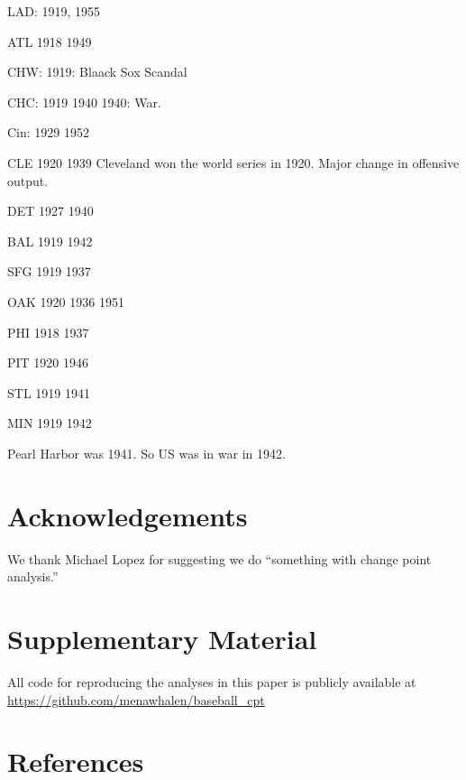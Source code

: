 \documentclass[
  12pt,
]{article}
\begin{document}
LAD: 1919, 1955

ATL 1918 1949

CHW: 1919: Blaack Sox Scandal

CHC: 1919 1940 1940: War.

Cin: 1929 1952

CLE 1920 1939 Cleveland won the world series in 1920. Major change in
offensive output.

DET 1927 1940

BAL 1919 1942

SFG 1919 1937

OAK 1920 1936 1951

PHI 1918 1937

PIT 1920 1946

STL 1919 1941

MIN 1919 1942

Pearl Harbor was 1941. So US was in war in 1942.

\hypertarget{acknowledgements}{%
\section*{Acknowledgements}\label{acknowledgements}}

We thank Michael Lopez for suggesting we do ``something with change
point analysis.''

\hypertarget{supplementary-material}{%
\section*{Supplementary Material}\label{supplementary-material}}

All code for reproducing the analyses in this paper is publicly
available at \url{https://github.com/menawhalen/baseball_cpt}

\hypertarget{references}{%
\section*{References}\label{references}}
\end{document}
